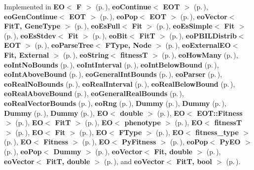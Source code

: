 Implemented in {\bf EO$<$ F $>$} {\rm (p.\,\pageref{class_e_o_z10_2})}, {\bf eo\-Continue$<$ EOT $>$} {\rm (p.\,\pageref{classeo_continue_a2})}, {\bf eo\-Gen\-Continue$<$ EOT $>$} {\rm (p.\,\pageref{classeo_gen_continue_a7})}, {\bf eo\-Pop$<$ EOT $>$} {\rm (p.\,\pageref{classeo_pop_a18})}, {\bf eo\-Vector$<$ Fit\-T, Gene\-Type $>$} {\rm (p.\,\pageref{classeo_vector_a4})}, {\bf eo\-Es\-Full$<$ Fit $>$} {\rm (p.\,\pageref{classeo_es_full_a2})}, {\bf eo\-Es\-Simple$<$ Fit $>$} {\rm (p.\,\pageref{classeo_es_simple_a2})}, {\bf eo\-Es\-Stdev$<$ Fit $>$} {\rm (p.\,\pageref{classeo_es_stdev_a2})}, {\bf eo\-Bit$<$ Fit\-T $>$} {\rm (p.\,\pageref{classeo_bit_a2})}, {\bf eo\-PBILDistrib$<$ EOT $>$} {\rm (p.\,\pageref{classeo_p_b_i_l_distrib_a3})}, {\bf eo\-Parse\-Tree$<$ FType, Node $>$} {\rm (p.\,\pageref{classeo_parse_tree_a5})}, {\bf eo\-External\-EO$<$ Fit, External $>$} {\rm (p.\,\pageref{classeo_external_e_o_a4})}, {\bf eo\-String$<$ fitness\-T $>$} {\rm (p.\,\pageref{classeo_string_z24_1})}, {\bf eo\-How\-Many} {\rm (p.\,\pageref{classeo_how_many_a5})}, {\bf eo\-Int\-No\-Bounds} {\rm (p.\,\pageref{classeo_int_no_bounds_a14})}, {\bf eo\-Int\-Interval} {\rm (p.\,\pageref{classeo_int_interval_a15})}, {\bf eo\-Int\-Below\-Bound} {\rm (p.\,\pageref{classeo_int_below_bound_a15})}, {\bf eo\-Int\-Above\-Bound} {\rm (p.\,\pageref{classeo_int_above_bound_a15})}, {\bf eo\-General\-Int\-Bounds} {\rm (p.\,\pageref{classeo_general_int_bounds_a18})}, {\bf eo\-Parser} {\rm (p.\,\pageref{classeo_parser_a3})}, {\bf eo\-Real\-No\-Bounds} {\rm (p.\,\pageref{classeo_real_no_bounds_a13})}, {\bf eo\-Real\-Interval} {\rm (p.\,\pageref{classeo_real_interval_a14})}, {\bf eo\-Real\-Below\-Bound} {\rm (p.\,\pageref{classeo_real_below_bound_a14})}, {\bf eo\-Real\-Above\-Bound} {\rm (p.\,\pageref{classeo_real_above_bound_a14})}, {\bf eo\-General\-Real\-Bounds} {\rm (p.\,\pageref{classeo_general_real_bounds_a17})}, {\bf eo\-Real\-Vector\-Bounds} {\rm (p.\,\pageref{classeo_real_vector_bounds_a9})}, {\bf eo\-Rng} {\rm (p.\,\pageref{classeo_rng_a16})}, {\bf Dummy} {\rm (p.\,\pageref{struct_dummy_a1})}, {\bf Dummy} {\rm (p.\,\pageref{struct_dummy_a2})}, {\bf Dummy} {\rm (p.\,\pageref{struct_dummy_a3})}, {\bf Dummy} {\rm (p.\,\pageref{struct_dummy_a4})}, {\bf EO$<$ double $>$} {\rm (p.\,\pageref{class_e_o_z10_2})}, {\bf EO$<$ EOT::Fitness $>$} {\rm (p.\,\pageref{class_e_o_z10_2})}, {\bf EO$<$ Fit\-T $>$} {\rm (p.\,\pageref{class_e_o_z10_2})}, {\bf EO$<$ phenotype $>$} {\rm (p.\,\pageref{class_e_o_z10_2})}, {\bf EO$<$ fitness\-T $>$} {\rm (p.\,\pageref{class_e_o_z10_2})}, {\bf EO$<$ Fit $>$} {\rm (p.\,\pageref{class_e_o_z10_2})}, {\bf EO$<$ FType $>$} {\rm (p.\,\pageref{class_e_o_z10_2})}, {\bf EO$<$ fitness\_\-type $>$} {\rm (p.\,\pageref{class_e_o_z10_2})}, {\bf EO$<$ Fitness $>$} {\rm (p.\,\pageref{class_e_o_z10_2})}, {\bf EO$<$ Py\-Fitness $>$} {\rm (p.\,\pageref{class_e_o_z10_2})}, {\bf eo\-Pop$<$ Py\-EO $>$} {\rm (p.\,\pageref{classeo_pop_a18})}, {\bf eo\-Pop$<$ Dummy $>$} {\rm (p.\,\pageref{classeo_pop_a18})}, {\bf eo\-Vector$<$ Fit, double $>$} {\rm (p.\,\pageref{classeo_vector_a4})}, {\bf eo\-Vector$<$ Fit\-T, double $>$} {\rm (p.\,\pageref{classeo_vector_a4})}, and {\bf eo\-Vector$<$ Fit\-T, bool $>$} {\rm (p.\,\pageref{classeo_vector_a4})}.

